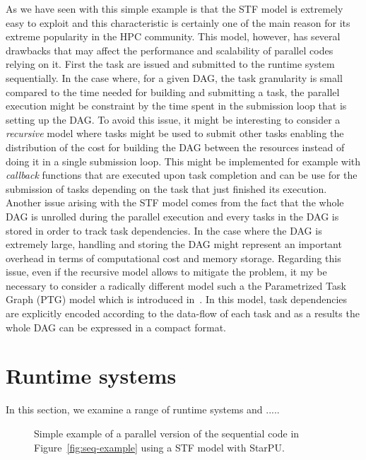 \documentclass{article}
\newcommand{\starpu}{{StarPU}\xspace}
\begin{document}
As we have seen with this simple example is that the STF model is
extremely easy to exploit and this characteristic is certainly one of
the main reason for its extreme popularity in the HPC community. This
model, however, has several drawbacks that may affect the performance
and scalability of parallel codes relying on it. First the task are
issued and submitted to the runtime system sequentially. In the case
where, for a given DAG, the task granularity is small compared to the
time needed for building and submitting a task, the parallel execution
might be constraint by the time spent in the submission loop that is
setting up the DAG. To avoid this issue, it might be interesting to
consider a \textit{recursive} model where tasks might be used to
submit other tasks enabling the distribution of the cost for building
the DAG between the resources instead of doing it in a single
submission loop. This might be implemented for example with
\textit{callback} functions that are executed upon task completion and
can be use for the submission of tasks depending on the task that just
finished its execution. Another issue arising with the STF model comes
from the fact that the whole DAG is unrolled during the parallel
execution and every tasks in the DAG is stored in order to track task
dependencies. In the case where the DAG is extremely large, handling
and storing the DAG might represent an important overhead in terms of
computational cost and memory storage. Regarding this issue, even if
the recursive model allows to mitigate the problem, it my be necessary
to consider a radically different model such a the Parametrized Task
Graph (PTG) model which is introduced in~\cite{c.l:95}. In this model,
task dependencies are explicitly encoded according to the data-flow of
each task and as a results the whole DAG can be expressed in a compact
format.


\section{Runtime systems}\label{sec:runtime}
\setcounter{equation}{0}
\setcounter{table}{0}
\setcounter{figure}{0}
In this section, we examine a range of runtime systems and .....

\begin{figure}[!h]
  \centering 
  \caption{\label{fig:stf-starpu-example}Simple example of a parallel version
    of the sequential code in Figure~\ref{fig:seq-example} using a STF
    model with \starpu.}
\end{figure}
\end{document}
